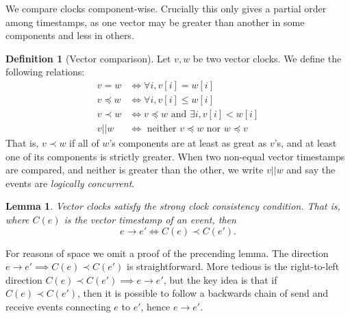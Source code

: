 \documentclass[]             %
{NASA}                       %
\newtheorem{lemma}[theorem]{Lemma}
\theoremstyle{definition}
\newtheorem{definition}{Definition}[section]
\begin{document}
\afterpage{\clearpage}

We compare clocks component-wise. Crucially this only gives a partial
order among timestamps, as one vector may be greater than another in
some components and less in others.

\begin{definition}[Vector comparison]
  Let $v, w$ be two vector clocks. We define the following relations:
  \begin{align*}
             v = w &\iff \forall i, v[i] = w[i] \\
  v \preccurlyeq w &\iff \forall i, v[i] \leq w[i] \\
         v \prec w &\iff v \preccurlyeq w \textrm{ and } \exists i, v[i] < w[i] \\
            v || w &\iff \textrm{ neither } v \preccurlyeq w \textrm{ nor } w \preccurlyeq v
  \end{align*}
  That is, $v \prec w$ if all of $w$'s components are at least as
  great as $v$'s, and at least one of its components is strictly
  greater. When two non-equal vector timestamps are compared, and
  neither is greater than the other, we write $v || w$ and say the
  events are \emph{logically concurrent}.
\end{definition}

\begin{lemma}
  Vector clocks satisfy the strong clock consistency condition. That
  is, where $C(e)$ is the vector timestamp of an event, then
  \[ e \to e' \iff C(e) \prec C(e'). \]
\end{lemma}

For reasons of space we omit a proof of the precending lemma.  The
direction $e \to e' \implies C(e) \prec C(e')$ is
straightforward. More tedious is the right-to-left direction
$C(e) \prec C(e') \implies e \to e'$, but the key idea is that if
$C(e) \prec C(e')$, then it is possible to follow a backwards chain of
send and receive events connecting $e$ to $e'$, hence $e \to e'$.


\end{document}
